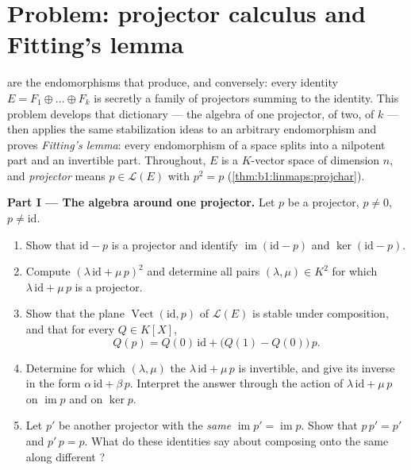 \section{Problem: projector calculus and Fitting's lemma}

\begin{problem}\label{pb:b1:linmaps:1}
 are the endomorphisms that  produce, and
conversely: every identity $E = F_1 \oplus \dots \oplus F_k$ is
secretly a family of projectors summing to the identity. This
problem develops that dictionary --- the algebra of one
projector, of two, of $k$ --- then applies the same
stabilization ideas to an arbitrary endomorphism and proves
\emph{Fitting's lemma}: every endomorphism of a
 space splits into a nilpotent part and an
invertible part. Throughout, $E$ is a $K$-vector space of
dimension $n$, and \emph{projector} means $p \in \mathcal{L}(E)$
with $p^2 = p$ (\cref{thm:b1:linmaps:projchar}).

\medskip
\noindent\textbf{Part I --- The algebra around one projector.}
Let $p$ be a projector, $p \neq 0$, $p \neq \mathrm{id}$.
\begin{enumerate}
  \item Show that $\mathrm{id} - p$ is a projector and identify
        $\operatorname{im}(\mathrm{id} - p)$ and
        $\ker(\mathrm{id} - p)$.
  \item Compute $(\lambda\,\mathrm{id} + \mu\,p)^2$ and determine
        all pairs $(\lambda, \mu) \in K^2$ for which
        $\lambda\,\mathrm{id} + \mu\,p$ is a projector.
  \item Show that the plane $\operatorname{Vect}(\mathrm{id}, p)$
        of $\mathcal{L}(E)$ is stable under composition, and that
        for every  $Q \in K[X]$,
        \[
        Q(p) = Q(0)\,\mathrm{id} + \bigl(Q(1) -
        Q(0)\bigr)\,p .
        \]
  \item Determine for which $(\lambda, \mu)$ the 
        $\lambda\,\mathrm{id} + \mu\,p$ is invertible, and give
        its inverse in the form $\alpha\,\mathrm{id} + \beta\,p$.
        Interpret the answer through the action of
        $\lambda\,\mathrm{id} + \mu\,p$ on $\operatorname{im} p$
        and on $\ker p$.
  \item Let $p'$ be another projector with the \emph{same }
        $\operatorname{im} p' = \operatorname{im} p$. Show that
        $p\,p' = p'$ and $p'\,p = p$. What do these identities
        say about composing  onto the same 
        along different ?
\end{enumerate}


\end{problem}
